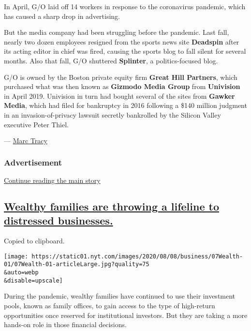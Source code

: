 In April, G/O laid off 14 workers in response to the coronavirus
pandemic, which has caused a sharp drop in advertising.

But the media company had been struggling before the pandemic. Last
fall, nearly two dozen employees resigned from the sports news site
\textbf{Deadspin} after its acting editor in chief was fired, causing
the sports blog to fall silent for several months. Also that fall, G/O
shuttered \textbf{Splinter}, a politics-focused blog.

G/O is owned by the Boston private equity firm \textbf{Great Hill
Partners}, which purchased what was then known as \textbf{Gizmodo Media
Group} from \textbf{Univision} in April 2019. Univision in turn had
bought several of the sites from \textbf{Gawker Media}, which had filed
for bankruptcy in 2016 following a \$140 million judgment in an
invasion-of-privacy lawsuit secretly bankrolled by the Silicon Valley
executive Peter Thiel.

--- \href{https://www.nytimes.com/by/marc-tracy}{Marc Tracy}

\hypertarget{advertisement}{%
\subsubsection{Advertisement}\label{advertisement}}

\protect\hyperlink{after-dfp-ad-mid1}{Continue reading the main story}

\hypertarget{wealthy-families-are-throwing-a-lifeline-to-distressed-businesses}{%
\subsection{\texorpdfstring{\protect\hyperlink{wealthy-families-are-throwing-a-lifeline-to-distressed-businesses}{Wealthy
families are throwing a lifeline to distressed
businesses.}}{Wealthy families are throwing a lifeline to distressed businesses.}}\label{wealthy-families-are-throwing-a-lifeline-to-distressed-businesses}}

Copied to clipboard.

\texttt{[image: https://static01.nyt.com/images/2020/08/08/business/07Wealth-01/07Wealth-01-articleLarge.jpg?quality=75\\\&auto=webp\\\&disable=upscale]}

During the pandemic, wealthy families have continued to use their
investment pools, known as family offices, to gain access to the type of
high-return opportunities once reserved for institutional investors. But
they are taking a more hands-on role in those financial decisions.

